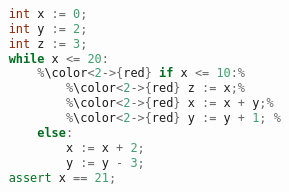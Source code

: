 \begin{lstlisting}[language=C++, style=withAssert]  % Start your code-block
	
	int x := 0;
	int y := 2;
	int z := 3;
	while x <= 20:
		%\color<2->{red} if x <= 10:%
			%\color<2->{red} z := x;%
			%\color<2->{red} x := x + y;%
			%\color<2->{red} y := y + 1; %
		else:
			x := x + 2;
			y := y - 3;
	assert x == 21;
	\end{lstlisting}